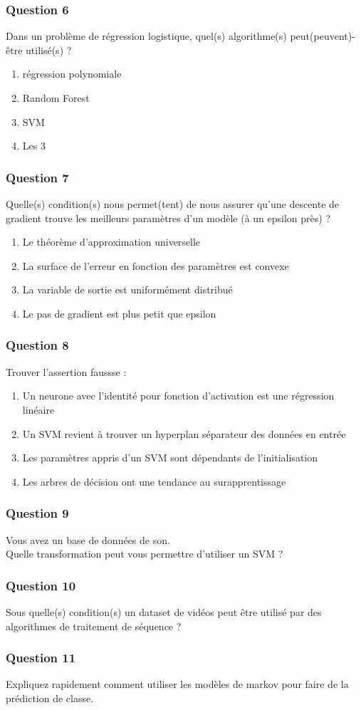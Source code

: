 \documentclass{formation}
\begin{document}
\begin{frame}
  \frametitle{Question 6}
  Dans un problème de régression logistique, quel(s) algorithme(s) peut(peuvent)-être utilisé(s) ?
  \begin{enumerate}
  \item régression polynomiale
  \item Random Forest
  \item SVM
  \item Les 3
  \end{enumerate}
\end{frame}

\begin{frame}
  \frametitle{Question 7}
  Quelle(s) condition(s) nous permet(tent) de nous assurer qu'une descente de gradient trouve les meilleurs paramètres d'un modèle (à un epsilon près) ?
  \begin{enumerate}
  \item Le théorème d'approximation universelle
  \item La surface de l'erreur en fonction des paramètres est convexe
  \item La variable de sortie est uniformément distribué
  \item Le pas de gradient est plus petit que epsilon
  \end{enumerate}
\end{frame}

\begin{frame}
  \frametitle{Question 8}
  Trouver l'assertion faussse :
  \begin{enumerate}
  \item Un neurone avec l'identité pour fonction d'activation est une régression linéaire
  \item Un SVM revient à trouver un hyperplan séparateur des données en entrée
  \item Les paramètres appris d'un SVM sont dépendants de l'initialisation
  \item Les arbres de décision ont une tendance au surapprentissage
  \end{enumerate}
\end{frame}

\begin{frame}
  \frametitle{Question 9}
  Vous avez un base de données de son. \\
  Quelle transformation peut vous permettre d'utiliser un SVM ?
\end{frame}

\begin{frame}
  \frametitle{Question 10}
  Sous quelle(s) condition(s) un dataset de vidéos peut être utilisé par des algorithmes de traitement de séquence ?
\end{frame}

\begin{frame}
  \frametitle{Question 11}
  Expliquez rapidement comment utiliser les modèles de markov pour faire de la prédiction de classe.
\end{frame}
\end{document}
